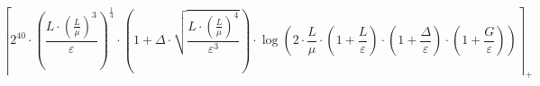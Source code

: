 \[\left\lceil 2^{40} \cdot \left(\frac{L \cdot \left(\frac{L}{\mu}\right)^{3}}{\varepsilon}\right)^{\frac{1}{4}} \cdot \left(1 + \Delta \cdot \sqrt{\frac{L \cdot \left(\frac{L}{\mu}\right)^{4}}{\varepsilon^{3}}}\right) \cdot \log\left(2 \cdot \frac{L}{\mu} \cdot \left(1 + \frac{L}{\varepsilon}\right) \cdot \left(1 + \frac{\Delta}{\varepsilon}\right) \cdot \left(1 + \frac{G}{\varepsilon}\right)\right) \right\rceil_{+}\]
